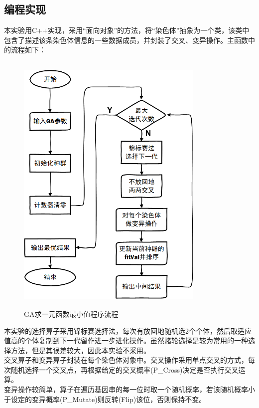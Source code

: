 \documentclass[UTF8]{ctexart}
\begin{document}
\subsection{编程实现}
本实验用C++实现，采用“面向对象”的方法，将“染色体”抽象为一个类，该类中包含了描述该条染色体信息的一些数据成员，并封装了交叉、变异操作。主函数中的流程如下：
\begin{figure}[htbp]\centering
\includegraphics [width=9cm,height=13cm]{../pic/T1-1_procedure.png} 
\caption{GA求一元函数最小值程序流程}
\end{figure}

\indent 本实验的选择算子采用锦标赛选择法，每次有放回地随机选2个个体，然后取适应值高的个体复制到下一代留作进一步进化操作。虽然赌轮选择是较为常用的一种选择方法，但是其误差较大，因此本实验不采用。\\
\indent 交叉算子和变异算子封装在每个染色体对象中。交叉操作采用单点交叉的方式，每次随机选择一个交叉点，再根据给定的交叉概率(P\_Cross)决定是否执行交叉运算。\\
\indent 变异操作较简单，算子在遍历基因串的每一位时取一个随机概率，若该随机概率小于设定的变异概率(P\_Mutate)则反转(Flip)该位，否则保持不变。
\end{document}
